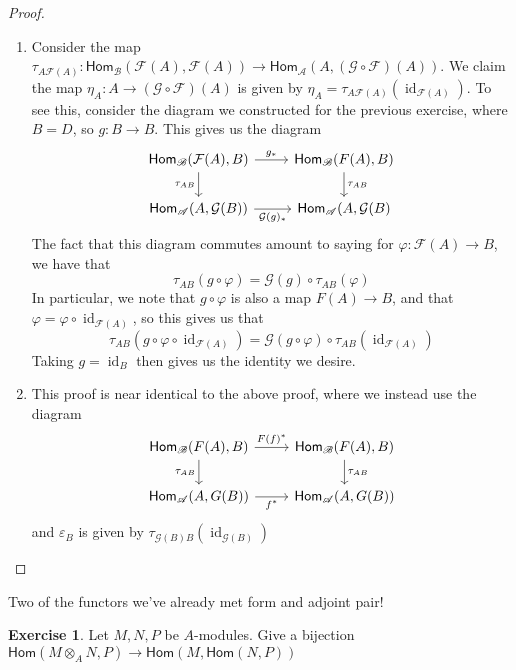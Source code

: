 \documentclass[psamsfonts]{amsart}
\theoremstyle{definition}
\newtheorem{exer}[thm]{Exercise}
\theoremstyle{remark}
\renewcommand{\hom}{\mathsf{Hom}}
\newcommand{\enumbreak}{\ \\ \vspace{-\baselineskip}}
\DeclareMathOperator{\id}{id}
\begin{document}
%
\begin{proof}\enumbreak
\begin{enumerate}
\item Consider the map $\tau_{A\mathcal{F}(A)} : \hom_\mathscr{B}(\mathcal{F}(A), \mathcal{F}(A)) \to \hom_\mathscr{A}(A, (\mathcal{G} \circ \mathcal{F})(A))$. We claim the map $\eta_A : A \to (\mathcal{G \circ F})(A)$ is given by $\eta_A = \tau_{A\mathcal{F}(A)}(\id_{\mathcal{F}(A)})$. To see this, consider the diagram we constructed for the previous exercise, where $B = D$, so $g : B \to B$. This gives  us the diagram
$$\begin{tikzcd}
\hom_\mathscr{B}(\mathcal{F}(A),B) \arrow[d, "\tau_{AB}"'] \arrow[r,"g_*"] & \hom_\mathscr{B}(F(A),B) \arrow[d, "\tau_{AB}"]\\
\hom_\mathscr{A}(A,\mathcal{G}(B))  \arrow[r, "\mathcal{G}(g)_*"'] & \hom_\mathscr{A}(A,\mathcal{G}(B)
\end{tikzcd}$$
The fact that this diagram commutes amount to saying for $\varphi : \mathcal{F}(A) \to B$, we have that
$$\tau_{AB}(g\circ \varphi) = \mathcal{G}(g) \circ \tau_{AB}(\varphi) $$
In particular, we note that $g \circ \varphi$ is also a map $F(A) \to B$, and that $\varphi = \varphi \circ \id_{\mathcal{F}(A)}$, so this gives us that
$$\tau_{AB}(g \circ \varphi \circ \id_{\mathcal{F}(A)}) = \mathcal{G}(g \circ \varphi) \circ \tau_{AB}(\id_{\mathcal{F}(A)}) $$
Taking $g = \id_B$ then gives us the identity we desire.
\item This proof is near identical to the above proof, where we instead use the diagram
$$\begin{tikzcd}
\hom_\mathscr{B}(F(A),B) \arrow[d,"\tau_{AB}"']\arrow[r,"F(f)^*"] & \hom_\mathscr{B}(F(A),B) \arrow[d, "\tau_{AB}"] \\
\hom_\mathscr{A}(A,G(B)) \arrow[r, "f^*"'] & \hom_\mathscr{A}(A,G(B))
\end{tikzcd}$$
and $\varepsilon_B$ is given by $\tau_{\mathcal{G}(B)B}(\id_{\mathcal{G}(B)})$
\end{enumerate}
\end{proof}
%
Two of the functors we've already met form and adjoint pair!
%
\begin{exer}
Let $M,N,P$ be $A$-modules. Give a bijection $\hom(M \otimes_A N, P) \to \hom(M,\hom(N,P))$
\end{exer}
%
\end{document}
